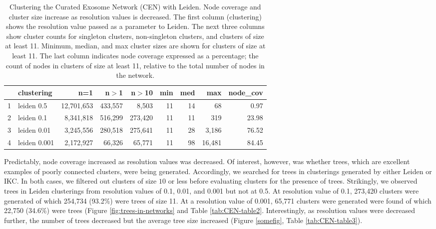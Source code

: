 \documentclass[11pt]{article}   	%
\begin{document}
\begin{table}[ht]
\centering
\begin{tabular}{rlrrrrrrr}
  \hline
 & clustering & n=1 & n$>$1 & n$>$10 & min & med & max & node\_cov \\
  \hline
1 & leiden 0.5 & 12,701,653 & 433,557 & 8,503 & 11 & 14 & 68 & 0.97 \\
  2 & leiden 0.1 & 8,341,818 & 516,299 & 273,420 & 11 & 11 & 319 & 23.98 \\
  3 & leiden 0.01 & 3,245,556 & 280,518 & 275,641 & 11 & 28 & 3,186 & 76.52 \\
  4 & leiden 0.001 & 2,172,927 & 66,326 & 65,771 & 11 & 98 & 16,481 & 84.45 \\
   \hline
\end{tabular}
\caption{Clustering the Curated Exosome Network (CEN) with Leiden. Node coverage and cluster size increase as resolution values is decreased. The first column (clustering) shows the resolution value passed as a parameter to Leiden. The next three columns show cluster counts for singleton clusters, non-singleton clusters, and clusters of size at least 11. Minimum, median, and max cluster sizes are shown for clusters of size at least 11. The last column indicates node coverage expressed as a percentage; the count of nodes in clusters of size at least 11, relative to the total number of nodes in the network.}
\label{tab:CEN-table1}
\end{table}

Predictably, node coverage increased as resolution values was decreased. Of interest, however, was whether trees, which are excellent examples of poorly connected clusters, were being generated. Accordingly, we searched for trees in clusterings generated by either Leiden or IKC. In both cases, we filtered out clusters of size $10$ or less before evaluating clusters for the presence of trees. Strikingly, we observed trees in Leiden clusterings from resolution values of 0.1, 0.01, and 0.001 but not at 0.5. At resolution value of 0.1, 273,420 clusters were generated of which 254,734 (93.2\%) were trees of size 11. At a resolution value of 0.001, 65,771 clusters were generated were found of which 22,750 (34.6\%) were 
trees (Figure \ref{fig:trees-in-networks} and Table \ref{tab:CEN-table2}. Interestingly, as resolution values were decreased further, the number of trees decreased but the average tree size increased (Figure \ref{somefig}, Table \ref{tab:CEN-table3}).
\end{document}
